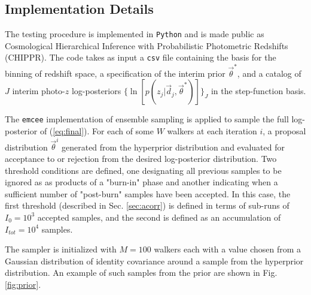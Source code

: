 \documentclass[preprint]{aastex}
\begin{document}
\subsection{Implementation Details}
\label{sec:mcmc}

The testing procedure is implemented in \texttt{Python} and is made public as 
Cosmological Hierarchical Inference with Probabilistic Photometric Redshifts 
(CHIPPR).  The code takes as input a \texttt{csv} file containing the basis for 
the binning of redshift space, a specification of the interim prior 
$\vec{\theta}^{*}$, and a catalog of $J$ interim photo-$z$ log-posteriors 
$\{\ln[p(z_{j}|\vec{d}_{j},\vec{\theta}^{*})]\}_{J}$ in the step-function basis.

The \texttt{emcee} \citep{Foreman-Mackey2013} implementation of ensemble 
sampling is applied to sample the full log-posterior of (\ref{eq:final}).   For 
each of some $W$ walkers at each iteration $i$, a proposal distribution 
$\vec{\theta}^{i}$ generated from the hyperprior distribution and evaluated for 
acceptance to or rejection from the desired log-posterior distribution.  Two 
threshold conditions are defined, one designating all previous samples to be 
ignored as as products of a "burn-in" phase and another indicating when a 
sufficient number of "post-burn" samples have been accepted.  In this case, the 
first threshold (described in Sec. \ref{sec:acorr}) is defined in terms of 
sub-runs of $I_{0}=10^{3}$ accepted samples, and the second is defined as an 
accumulation of $I_{tot}=10^{4}$ samples.

The sampler is initialized with $M=100$ walkers each with a value chosen from a 
Gaussian distribution of identity covariance around a sample from the 
hyperprior distribution.  An example of such samples from the prior are shown 
in Fig. \ref{fig:prior}.
\end{document}
